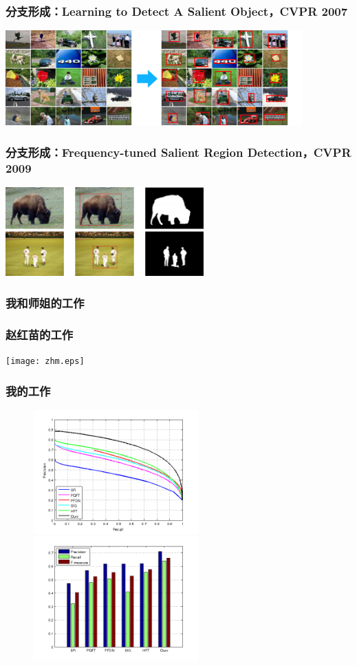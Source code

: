 \documentclass[notheorems,mathserif,table,compress]{beamer}  %
\begin{document}
\begin{frame}
  \frametitle{分支形成：Learning to Detect A Salient Object，CVPR 2007}
  \centering\includegraphics[width=4.5in]{MSRA.jpg}
\end{frame}


\begin{frame}
  \frametitle{分支形成：Frequency-tuned Salient Region Detection，CVPR 2009}
  \centering\includegraphics[width=3in]{FT.png}
\end{frame}

\subsubsection{我和师姐的工作}

\begin{frame}
  \frametitle{赵红苗的工作}
  \centering\texttt{[image: zhm.eps]}
\end{frame}


\begin{frame}
  \frametitle{我的工作}
  \begin{figure}[!ht]
  \begin{minipage}[t]{0.5\textwidth}
  \includegraphics[width=2.5in]{PR_OTSU_1.2.png}
  \end{minipage}
  \begin{minipage}[t]{0.45\textwidth}
  \includegraphics[width=2.5in]{PRF_OTSU_1.2.png}
  \end{minipage}
  \end{figure} 
\end{frame}
\end{document}
